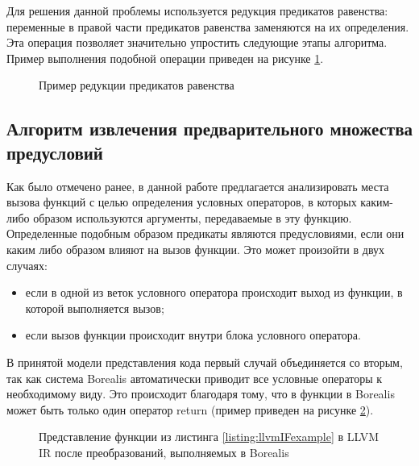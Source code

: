 Для решения данной проблемы используется редукция предикатов равенства: переменные в правой части предикатов равенства заменяются на их определения. Эта операция позволяет значительно упростить следующие этапы алгоритма. Пример выполнения подобной операции приведен на рисунке \ref{image:equalityMapperExample}.
\begin{figure}[h!]
\caption{Пример редукции предикатов равенства}
\label{image:equalityMapperExample}
\end{figure}

\subsection{Алгоритм извлечения предварительного множества предусловий}
\label{subsection:extraction}
Как было отмечено ранее, в данной работе предлагается анализировать места вызова функций с целью определения условных операторов, в которых каким-либо образом используются аргументы, передаваемые в эту функцию. Определенные подобным образом предикаты являются предусловиями, если они каким либо образом влияют на вызов функции. Это может произойти в двух случаях:
\begin{itemize}
\item если в одной из веток условного оператора происходит выход из функции, в которой выполняется вызов;
\item если вызов функции происходит внутри блока условного оператора.
\end{itemize}

В принятой модели представления кода первый случай объединяется со вторым, так как система Borealis автоматически приводит все условные операторы к необходимому виду. Это происходит благодаря тому, что в функции в Borealis может быть только один оператор return (пример приведен на рисунке \ref{image:llvmIFcfg}).

 	
\begin{figure}[h!]
\caption{Представление функции из листинга \ref{listing:llvmIFexample} в LLVM IR после преобразований, выполняемых в Borealis}
\label{image:llvmIFcfg}
\end{figure}

